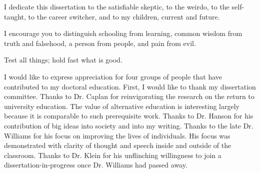 \documentclass[11 pt]{report}
\begin{document}
\author{John Vandivier}






\titlepage
\copyrightpage

\dedicationpage

\noindent I dedicate this dissertation
to the satisfiable skeptic,
to the weirdo,
to the self-taught,
to the career switcher,
and to my children, current and future.

\bigskip

\noindent I encourage you to distinguish schooling from learning,
common wisdom from truth and falsehood,
a person from people,
and pain from evil.

\bigskip

\noindent Test all things; hold fast what is good.


\acknowledgementspage

\noindent I would like to express appreciation for four groups of people that have contributed to my doctoral education.
First, I would like to thank my dissertation committee.
Thanks to Dr. Caplan for reinvigorating the research on the return to university education.
The value of alternative education is interesting largely because it is comparable to such prerequisite work.
Thanks to Dr. Hanson for his contribution of big ideas into society and into my writing.
Thanks to the late Dr. Williams for his focus on improving the lives of individuals.
His focus was demonstrated with clarity of thought and speech inside and outside of the classroom.
Thanks to Dr. Klein for his unflinching willingness to join a dissertation-in-progress once Dr. Williams had passed away.
\end{document}
